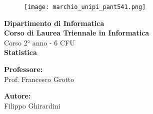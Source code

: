 \begin{titlepage} %
\begin{figure}[t] %
    \centering\texttt{[image: marchio\_unipi\_pant541.png]}
\end{figure}
\vspace{20mm}

\begin{Large}
 \begin{center}
	\textbf{Dipartimento di Informatica\\ Corso di Laurea Triennale in Informatica\\}
	\vspace{20mm}
    {\LARGE{Corso 2° anno - 6 CFU}}\\
	\vspace{10mm}
	{\huge{\bf Statistica}}\\
\end{center}
\end{Large}


\vspace{36mm}
\begin{minipage}[t]{0.47\textwidth}
	{\large{\bf Professore:}\\ \large{Prof. Francesco Grotto}}
\end{minipage}
\hfill
\begin{minipage}[t]{0.47\textwidth}\raggedleft
	{\large{\bf Autore:}\\ \large{Filippo Ghirardini}}
\end{minipage}

\vspace{25mm}

\hrulefill

\vspace{5mm}


\end{titlepage}